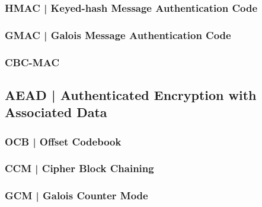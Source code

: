 
\textsf{\small }

\subsubsection{HMAC | Keyed-hash Message Authentication Code}


\textsf{\small }

\subsubsection{GMAC | Galois Message Authentication Code}


\textsf{\small }

\subsubsection{CBC-MAC}


\textsf{\small }


\subsection{AEAD | Authenticated Encryption with Associated Data}


\textsf{\small }

\subsubsection{OCB | Offset Codebook} %


\textsf{\small }

\subsubsection{CCM | Cipher Block Chaining}


\textsf{\small }

\subsubsection{GCM | Galois Counter Mode}


\textsf{\small }

